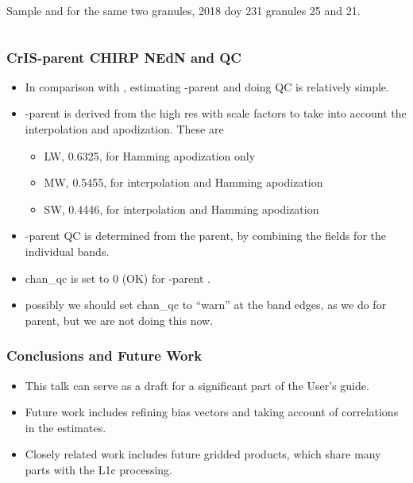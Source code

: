 \documentclass[9pt]{beamer}
\begin{document}
\begin{frame}
\begin{columns}[t]
\begin{column}{0.5\textwidth}
Sample {\airs} and {\cris} {\nedn} for the same two granules, 2018 doy
231 granules 25 and 21.

\end{column}
\end{columns}
\end{frame}
\begin{frame}
\frametitle{CrIS-parent CHIRP NEdN and QC}

\begin{itemize}

  \item In comparison with {\airs}, estimating {\cris}-parent
    {\chirp} {\nedn} and doing QC is relatively simple.

  \item {\cris}-parent {\chirp} {\nedn} is derived from the high
    res {\cris} {\nedn} with scale factors to take into account the
    interpolation and apodization.  These are
    \begin{itemize}
      \item LW, 0.6325, for Hamming apodization only
      \item MW, 0.5455, for interpolation and Hamming apodization
      \item SW, 0.4446, for interpolation and Hamming apodization
    \end{itemize}

  \item {\cris}-parent {\chirp} QC is determined from the {\cris}
    parent, by combining the fields for the individual {\cris} bands.

  \item chan\_qc is set to 0 (OK) for {\cris}-parent {\chirp}.

  \item possibly we should set chan\_qc to ``warn'' at the band
    edges, as we do for {\airs} parent, but we are not doing this
    now.

\end{itemize}
\end{frame}
\begin{frame}
\frametitle{Conclusions and Future Work}
\begin{itemize}

  \item This talk can serve as a draft for a significant part of the
    {\chirp} User's guide.

  \item Future work includes refining bias vectors and taking
    account of {\airs} correlations in the {\nedn} estimates.

  \item Closely related work includes future gridded products, which
    share many parts with the {\chirp} L1c processing.


\end{itemize}
\end{frame}
\end{document}
